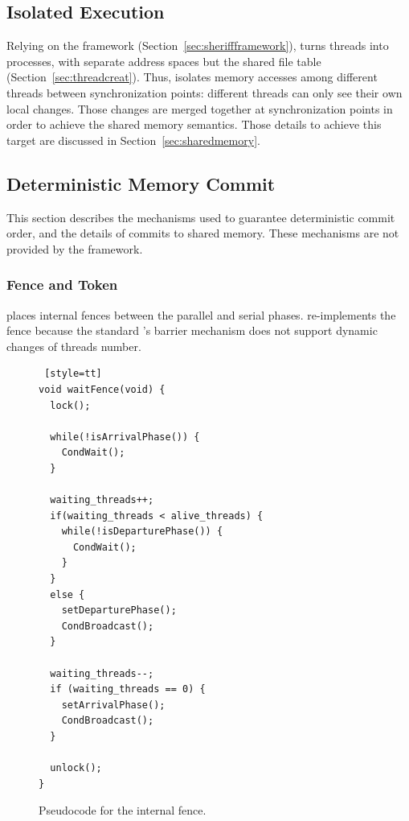 \subsection{Isolated Execution}
\label{sec:threadsasprocs}

Relying on the \sheriff{} framework (Section~\ref{sec:sheriffframework}), \dthreads{} turns threads into processes, with separate address spaces but the shared file table (Section~\ref{sec:threadcreat}). Thus, \dthreads{} isolates memory accesses among different threads between synchronization points: different threads can only see their own local changes. Those changes are merged together at synchronization points in order to achieve the shared memory semantics. Those details to achieve this target are discussed in Section~\ref{sec:sharedmemory}.  

\subsection{Deterministic Memory Commit}
\label{sec:sharedmem}

This section describes the mechanisms used to guarantee deterministic commit order, and the details of commits to shared memory. These mechanisms are not provided by the \sheriff{} framework.   

\subsubsection{Fence and Token}
\label{sec:schedule}

\dthreads{} places internal fences between the parallel and serial phases. \dthreads{} re-implements the fence because the standard \pthreads{}'s barrier mechanism does not support dynamic changes of threads number. 

\begin{figure}
\begin{lstlisting} [style=tt]
void waitFence(void) {
  lock();
	
  while(!isArrivalPhase()) { 
    CondWait();
  }

  waiting_threads++;
  if(waiting_threads < alive_threads) {
    while(!isDeparturePhase()) {
      CondWait();
    }
  } 
  else {
    setDeparturePhase();
    CondBroadcast();
  }

  waiting_threads--;
  if (waiting_threads == 0) {
    setArrivalPhase();
    CondBroadcast();
  }

  unlock();
}

\end{lstlisting}
\caption{Pseudocode for the internal fence.\label{fig:internalFence}}
\end{figure}

